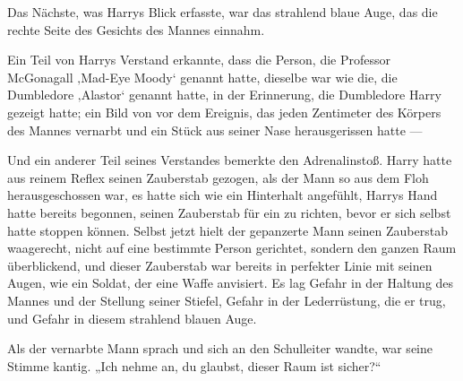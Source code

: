 Das Nächste, was Harrys Blick erfasste, war das strahlend blaue Auge, das die rechte Seite des Gesichts des Mannes einnahm.

Ein Teil von Harrys Verstand erkannte, dass die Person, die Professor McGonagall ‚Mad-Eye Moody‘ genannt hatte, dieselbe war wie die, die Dumbledore ‚Alastor‘ genannt hatte, in der Erinnerung, die Dumbledore Harry gezeigt hatte; ein Bild von vor dem Ereignis, das jeden Zentimeter des Körpers des Mannes vernarbt und ein Stück aus seiner Nase herausgerissen hatte —

Und ein anderer Teil seines Verstandes bemerkte den Adrenalinstoß. Harry hatte aus reinem Reflex seinen Zauberstab gezogen, als der Mann so aus dem Floh herausgeschossen war, es hatte sich wie ein Hinterhalt angefühlt, Harrys Hand hatte bereits begonnen, seinen Zauberstab für ein  zu richten, bevor er sich selbst hatte stoppen können.
Selbst jetzt hielt der gepanzerte Mann seinen Zauberstab waagerecht, nicht auf eine bestimmte Person gerichtet, sondern den ganzen Raum überblickend, und dieser Zauberstab war bereits in perfekter Linie mit seinen Augen, wie ein Soldat, der eine Waffe anvisiert. Es lag Gefahr in der Haltung des Mannes und der Stellung seiner Stiefel, Gefahr in der Lederrüstung, die er trug, und Gefahr in diesem strahlend blauen Auge.

Als der vernarbte Mann sprach und sich an den Schulleiter wandte, war seine Stimme kantig.
„Ich nehme an, du glaubst, dieser Raum ist sicher?“


